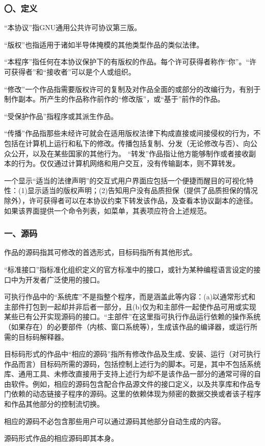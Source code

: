 \subsubsection{〇、定义}
“本协议”指GNU通用公共许可协议第三版。\par
“版权”也指适用于诸如半导体掩模的其他类型作品的类似法律。\par
“本程序”指任何在本协议保护下的有版权的作品。每个许可获得者称作“你”。“许可获得者”和“接收者”可以是个人或组织。\par
“修改”一个作品指需要版权许可的复制及对作品全面的或部分的改编行为，有别于制作副本。所产生的作品称作前作的“修改版”，或“基于”前作的作品。\par
“受保护作品”指程序或其派生作品。\par
“传播”作品指那些未经许可就会在适用版权法律下构成直接或间接侵权的行为，不包括在计算机上运行和私下的修改。传播包括复制、分发（无论修改与否）、向公众公开，以及在某些国家的其他行为。
“转发”作品指让他方能够制作或者接收副本的行为。仅仅通过计算机网络和用户交互，没有传输副本，则不算转发。\par
一个显示“适当的法律声明”的交互式用户界面应包括一个便捷而醒目的可视化特性：(1)显示适当的版权声明；(2)告知用户没有品质担保（提供了品质担保的情况除外），许可获得者可以在本协议约束下转发该作品，及查看本协议副本的途径。如果该界面提供一个命令列表，如菜单，其表项应符合上述规范。
\subsubsection{一、源码}
作品的源码指其可修改的首选形式，目标码指所有其他形式。\par
“标准接口”指标准化组织定义的官方标准中的接口，或针为某种编程语言设定的接口中为开发者广泛使用的接口。\par
可执行作品中的“系统库”不是指整个程序，而是涵盖此等内容：(a)以通常形式和主部件打包到一起却并非后者一部分，且(b)仅为和主部件一起使作品可用或实现某些已有公开实现源码的接口。“主部件”在这里指可执行作品运行依赖的操作系统（如果存在）的必要部件（内核、窗口系统等），生成该作品的编译器，或运行所需的目标码解释器。\par
目标码形式的作品中“相应的源码”指所有修改作品及生成、安装、运行（对可执行作品而言）目标码所需的源码，包括控制上述行为的脚本。可是，其中不包括系统库、通用工具、未修改直接用于支持上述行为却不是该作品一部分的通常可得的自由软件。例如，相应的源码包含配合作品源文件的接口定义，以及共享库和作品专门依赖的动态链接子程序的源码。这里的依赖体现为频密的数据交换或者该子程序和作品其他部分的控制流切换。\par
相应的源码不必包含那些用户可以通过源码其他部分自动生成的内容。\par
源码形式作品的相应源码即其本身。
